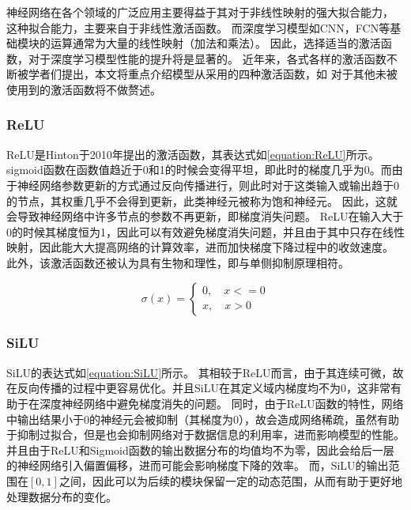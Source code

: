 
神经网络在各个领域的广泛应用主要得益于其对于非线性映射的强大拟合能力，
这种拟合能力，主要来自于非线性激活函数。
而深度学习模型如CNN，FCN等基础模块的运算通常为大量的线性映射（加法和乘法）。
因此，选择适当的激活函数，对于深度学习模型性能的提升将是显著的。
近年来，各式各样的激活函数不断被学者们提出，本文将重点介绍模型从采用的四种激活函数，如
对于其他未被使用到的激活函数将不做赘述。


\subsubsection{ReLU}

ReLU是Hinton于2010年提出的激活函数\cite{2010ReLU}，其表达式如\cref{equation:ReLU}所示。
sigmoid函数在函数值趋近于0和1的时候会变得平坦，即此时的梯度几乎为0。而由于神经网络参数更新的方式通过反向传播进行，则此时对于这类输入或输出趋于0的节点，其权重几乎不会得到更新，此类神经元被称为饱和神经元。
因此，这就会导致神经网络中许多节点的参数不再更新，即梯度消失问题。
ReLU在输入大于0的时候其梯度恒为1，因此可以有效避免梯度消失问题，并且由于其中只存在线性映射，因此能大大提高网络的计算效率，进而加快梯度下降过程中的收敛速度。
此外，该激活函数还被认为具有生物和理性，即与单侧抑制原理相符。

  \begin{equation}
    \label{equation:ReLU}
    \sigma(x) = 
    \left\{
    \begin{aligned}
      0, \quad x <= 0 \\
      x, \quad x > 0
    \end{aligned}
    \right.
    \end{equation}

    \subsubsection{SiLU}
  
    SiLU的表达式如\cref{equation:SiLU}所示。
    其相较于ReLU而言，由于其连续可微，故在反向传播的过程中更容易优化。并且SiLU在其定义域内梯度均不为0，这非常有助于在深度神经网络中避免梯度消失的问题。
    同时，由于ReLU函数的特性，网络中输出结果小于0的神经元会被抑制（其梯度为0），故会造成网络稀疏，虽然有助于抑制过拟合，但是也会抑制网络对于数据信息的利用率，进而影响模型的性能。
    并且由于ReLU和Sigmoid函数的输出数据分布的均值均不为零，因此会给后一层的神经网络引入偏置偏移，进而可能会影响梯度下降的效率。
    而，SiLU的输出范围在$[0, 1]$之间，因此可以为后续的模块保留一定的动态范围，从而有助于更好地处理数据分布的变化。

